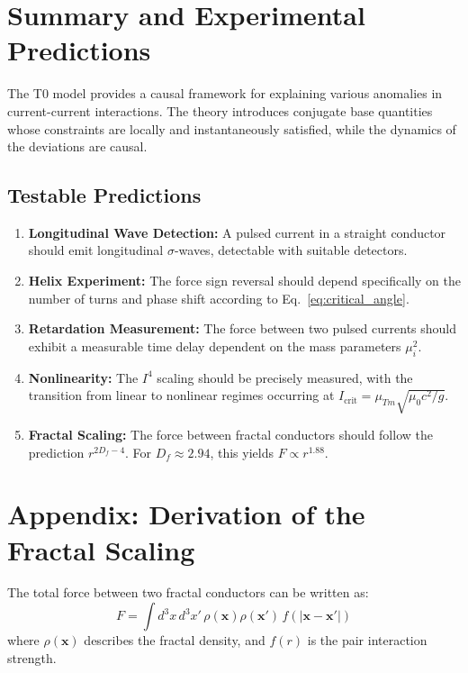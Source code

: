 \documentclass[10pt, a4paper]{article}
\begin{document}
	\section{Summary and Experimental Predictions}
	The T0 model provides a causal framework for explaining various anomalies in current-current interactions. The theory introduces conjugate base quantities whose constraints are locally and instantaneously satisfied, while the dynamics of the deviations are causal.
	
	\subsection{Testable Predictions}
	\begin{enumerate}
		\item \textbf{Longitudinal Wave Detection:} A pulsed current in a straight conductor should emit longitudinal $\sigma$-waves, detectable with suitable detectors.
		
		\item \textbf{Helix Experiment:} The force sign reversal should depend specifically on the number of turns and phase shift according to Eq.~\ref{eq:critical_angle}.
		
		\item \textbf{Retardation Measurement:} The force between two pulsed currents should exhibit a measurable time delay dependent on the mass parameters $\mu_i^2$.
		
		\item \textbf{Nonlinearity:} The $I^4$ scaling should be precisely measured, with the transition from linear to nonlinear regimes occurring at $I_{\text{crit}} = \mu_{Tm} \sqrt{\mu_0 c^2 / g}$.
		
		\item \textbf{Fractal Scaling:} The force between fractal conductors should follow the prediction $r^{2D_f - 4}$. For $D_f \approx 2.94$, this yields $F \propto r^{1.88}$.
	\end{enumerate}
	
	\section*{Appendix: Derivation of the Fractal Scaling}
	The total force between two fractal conductors can be written as:
	\begin{equation}
		F = \int d^3x \, d^3x' \, \rho(\mathbf{x}) \rho(\mathbf{x}') \, f(|\mathbf{x}-\mathbf{x}'|)
	\end{equation}
	where $\rho(\mathbf{x})$ describes the fractal density, and $f(r)$ is the pair interaction strength.
	
\end{document}
